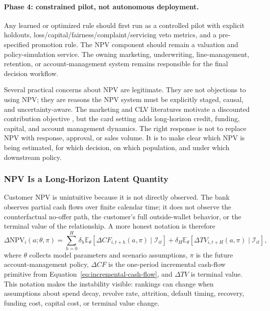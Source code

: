 \documentclass[11pt]{article}
\newcommand{\E}{\mathbb{E}}
\newcommand{\NPV}{\mathrm{NPV}}
\newcommand{\1}{\mathbf{1}}
\begin{document}
\paragraph{Phase 4: constrained pilot, not autonomous deployment.}
Any learned or optimized rule should first run as a controlled pilot with
explicit holdouts, loss/capital/fairness/complaint/servicing veto metrics, and a
pre-specified promotion rule. The NPV component should remain a valuation and
policy-simulation service. The owning marketing, underwriting, line-management,
retention, or account-management system remains responsible for the final
decision workflow.


Several practical concerns about NPV are legitimate. They are not objections to
using NPV; they are reasons the NPV system must be explicitly staged, causal,
and uncertainty-aware. The marketing and CLV literatures motivate a discounted
contribution objective \citep{bult1995directmail,berger1998clv,rust2004return,venkatesan2004clv},
but the card setting adds long-horizon credit, funding, capital, and account
management dynamics. The right response is not to replace NPV with response,
approval, or sales volume. It is to make clear which NPV is being estimated, for
which decision, on which population, and under which downstream policy.

\subsubsection{NPV Is a Long-Horizon Latent Quantity}
\label{subsec:npv-latent}

Customer NPV is unintuitive because it is not directly observed. The bank
observes partial cash flows over finite calendar time; it does not observe the
counterfactual no-offer path, the customer's full outside-wallet behavior, or
the terminal value of the relationship. A more honest notation is therefore
\begin{equation}
  \Delta \NPV_i(a;\theta,\pi)
  =
  \sum_{h=0}^{H}
  \delta_h
  \E_\theta[
    \Delta CF_{i,t+h}(a,\pi)
    \mid \mathcal{I}_{it}
  ]
  +
  \delta_H
  \E_\theta[
    \Delta TV_{i,t+H}(a,\pi)
    \mid \mathcal{I}_{it}
  ],
  \label{eq:npv-theta-policy}
\end{equation}
where $\theta$ collects model parameters and scenario assumptions, $\pi$ is the
future account-management policy, $\Delta CF$ is the one-period incremental
cash-flow primitive from Equation~\eqref{eq:incremental-cash-flow}, and
$\Delta TV$ is terminal value. This notation makes the instability visible:
rankings can change when assumptions about spend decay, revolve rate,
attrition, default timing, recovery, funding cost, capital cost, or terminal
value change.
\end{document}
